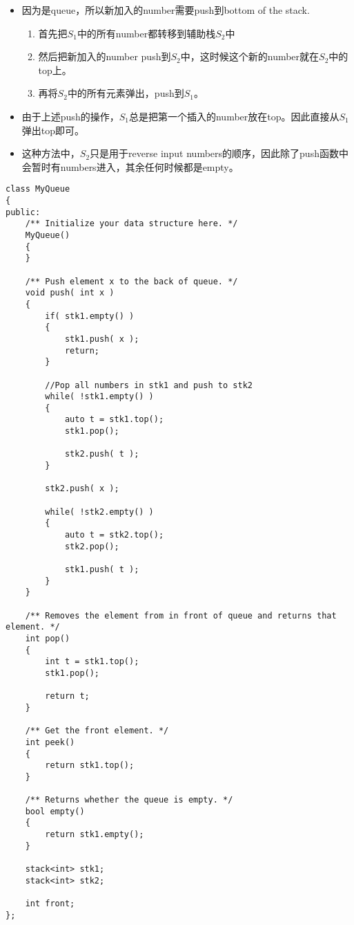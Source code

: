 \begin{itemize}
\item 因为是queue，所以新加入的number需要push到bottom of the stack.
\begin{enumerate}
\item 首先把$S_1$中的所有number都转移到辅助栈$S_2$中
\item 然后把新加入的number push到$S_2$中，这时候这个新的number就在$S_2$中的top上。
\item 再将$S_2$中的所有元素弹出，push到$S_1$。
\end{enumerate}
\item 由于上述push的操作，$S_1$总是把第一个插入的number放在top。因此直接从$S_1$弹出top即可。
\item 这种方法中，$S_2$只是用于reverse input numbers的顺序，因此除了push函数中会暂时有numbers进入，其余任何时候都是empty。
\end{itemize}

\setcounter{lstlisting}{0}
\begin{lstlisting}[style=customc,caption={Two Stacks}]
class MyQueue
{
public:
    /** Initialize your data structure here. */
    MyQueue()
    {
    }

    /** Push element x to the back of queue. */
    void push( int x )
    {
        if( stk1.empty() )
        {
            stk1.push( x );
            return;
        }

        //Pop all numbers in stk1 and push to stk2
        while( !stk1.empty() )
        {
            auto t = stk1.top();
            stk1.pop();

            stk2.push( t );
        }

        stk2.push( x );

        while( !stk2.empty() )
        {
            auto t = stk2.top();
            stk2.pop();

            stk1.push( t );
        }
    }

    /** Removes the element from in front of queue and returns that element. */
    int pop()
    {
        int t = stk1.top();
        stk1.pop();

        return t;
    }

    /** Get the front element. */
    int peek()
    {
        return stk1.top();
    }

    /** Returns whether the queue is empty. */
    bool empty()
    {
        return stk1.empty();
    }

    stack<int> stk1;
    stack<int> stk2;

    int front;
};
\end{lstlisting}
